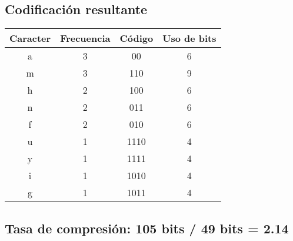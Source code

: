 \documentclass{article}
\begin{document}
\begin{center}
	\subsection*{Codificación resultante}
	\begin{tabular}{c|c|c|c}
		\textbf{Caracter} & \textbf{Frecuencia} & \textbf{Código} & \textbf{Uso de bits}\\
		\hline
		a & 3 & 00   & 6\\
		m & 3 & 110  & 9\\
		h & 2 & 100  & 6\\
		n & 2 & 011  & 6\\
		f & 2 & 010  & 6\\
		u & 1 & 1110 & 4\\
		y & 1 & 1111 & 4\\
		i & 1 & 1010 & 4\\
		g & 1 & 1011 & 4\\
	\end{tabular}
	\subsection*{Tasa de compresión: 105 bits / 49 bits = 2.14}	
	\end{center}
	
\end{document}

